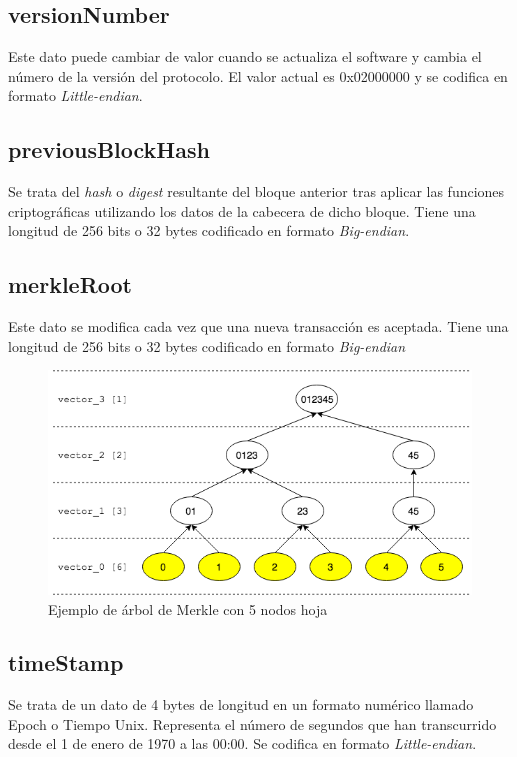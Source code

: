 \documentclass{article}
\begin{document}
    \subsection{versionNumber}
    Este dato puede cambiar de valor cuando se actualiza el software y cambia el número de la versión del protocolo. El valor actual es 0x02000000 y se codifica en formato \textit{Little-endian}.
    
    \subsection{previousBlockHash}
    Se trata del \textit{hash} o \textit{digest} resultante del bloque anterior tras aplicar las funciones criptográficas utilizando los datos de la cabecera de dicho bloque. Tiene una longitud de 256 bits o 32 bytes codificado en formato \textit{Big-endian}.
    
    \subsection{merkleRoot}
    Este dato se modifica cada vez que una nueva transacción es aceptada. Tiene una longitud de 256 bits o 32 bytes codificado en formato \textit{Big-endian}
    
    \begin{figure}[H]
    \centering
        \includegraphics[scale=0.55]{img/Merkle_tree_05_leaves_nodes}
        \caption{Ejemplo de árbol de Merkle con 5 nodos hoja}
    \end{figure}
    
    \subsection{timeStamp}
    Se trata de un dato de 4 bytes de longitud en un formato numérico llamado Epoch o Tiempo Unix. Representa el número de segundos que han transcurrido desde el 1 de enero de 1970 a las 00:00. Se codifica en formato \textit{Little-endian}.
    
\end{document}
